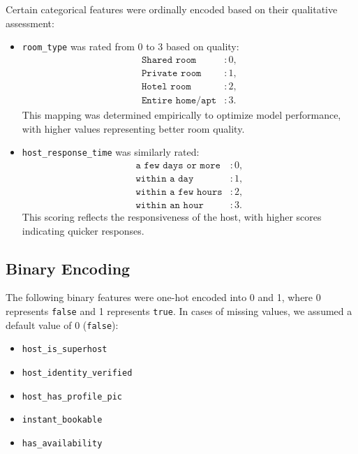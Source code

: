\documentclass[12pt]{article}
\begin{document}
Certain categorical features were ordinally encoded based on their qualitative assessment:

\begin{itemize}
    \item \texttt{room\_type} was rated from 0 to 3 based on quality:
    \[
    \begin{aligned}
    \texttt{Shared room} & : 0, \\
    \texttt{Private room} & : 1, \\
    \texttt{Hotel room} & : 2, \\
    \texttt{Entire home/apt} & : 3.
    \end{aligned}
    \]
    This mapping was determined empirically to optimize model performance, with higher values representing better room quality.
    
    \item \texttt{host\_response\_time} was similarly rated:
    \[
    \begin{aligned}
    \texttt{a few days or more} & : 0, \\
    \texttt{within a day} & : 1, \\
    \texttt{within a few hours} & : 2, \\
    \texttt{within an hour} & : 3.
    \end{aligned}
    \]
    This scoring reflects the responsiveness of the host, with higher scores indicating quicker responses.
\end{itemize}

\subsection{Binary Encoding}

The following binary features were one-hot encoded into 0 and 1, where 0 represents \texttt{false} and 1 represents \texttt{true}. In cases of missing values, we assumed a default value of 0 (\texttt{false}):

\begin{itemize}
    \item \texttt{host\_is\_superhost}
    \item \texttt{host\_identity\_verified}
    \item \texttt{host\_has\_profile\_pic}
    \item \texttt{instant\_bookable}
    \item \texttt{has\_availability}
\end{itemize}
\end{document}
